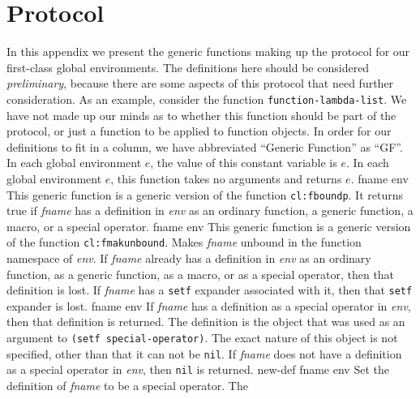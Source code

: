 \appendix

\section{Protocol}

In this appendix we present the generic functions making up the
protocol for our first-class global environments.  The definitions
here should be considered \emph{preliminary}, because there are some
aspects of this protocol that need further consideration.  As an
example, consider the function \texttt{function-lambda-list}.  We have
not made up our minds as to whether this function should be part of
the protocol, or just a function to be applied to function objects.
\vskip -0.02cm
In order for our definitions to fit in a column, we have abbreviated
``Generic Function'' as ``GF''.
\vskip -0.02cm
\vskip -0.2cm
In each global environment $e$, the value of this constant variable is
$e$.
\vskip -0.02cm
 {}
\vskip -0.2cm
In each global environment $e$, this function takes no arguments and
returns $e$.
\vskip -0.02cm
 {fname env}
\vskip -0.2cm
This generic function is a generic version of the \commonlisp{}
function \texttt{cl:fboundp}.
\vskip -0.02cm
It returns true if \textit{fname} has a definition in
\textit{env} as an ordinary function, a generic function, a
macro, or a special operator.
\vskip -0.02cm
 {fname env}
\vskip -0.2cm
This generic function is a generic version of the \commonlisp{}
function \texttt{cl:fmakunbound}.
\vskip -0.02cm
Makes \textit{fname} unbound in the function namespace of
\textit{env}.
\vskip -0.02cm
If \textit{fname} already has a definition in
\textit{env} as an ordinary function, as a generic function,
as a macro, or as a special operator, then that definition is lost.
\vskip -0.02cm
If \textit{fname} has a \texttt{setf} expander associated with
it, then that \texttt{setf} expander is lost.
\vskip -0.02cm
 {fname env}
\vskip -0.2cm
If \textit{fname} has a definition as a special operator in
\textit{env}, then that definition is returned.  The definition is
the object that was used as an argument to \texttt{(setf
  special-operator)}.  The exact nature of this object is not
specified, other than that it can not be \texttt{nil}.  If
\textit{fname} does not have a definition as a special operator in
\textit{env}, then \texttt{nil} is returned.
\vskip -0.02cm
 {new-def fname env}
\vskip -0.2cm
Set the definition of \textit{fname} to be a special operator.  The
